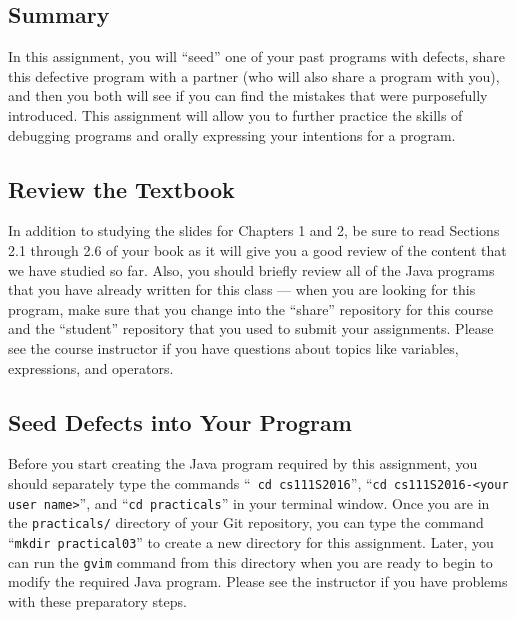


\vspace*{-.3in}
\subsection*{Summary}

In this assignment, you will ``seed'' one of your past programs with defects, share this defective program with a
partner (who will also share a program with you), and then you both will see if you can find the mistakes that were
purposefully introduced. This assignment will allow you to further practice the skills of debugging programs and orally
expressing your intentions for a program.

\vspace*{-.15in}
\subsection*{Review the Textbook}
\vspace*{-.075in}

In addition to studying the slides for Chapters 1 and 2, be sure to read Sections 2.1 through 2.6 of your book as it
will give you a good review of the content that we have studied so far. Also, you should briefly review all of the Java
programs that you have already written for this class --- when you are looking for this program, make sure that you
change into the ``share'' repository for this course and the ``student'' repository that you used to submit your
assignments. Please see the course instructor if you have questions about topics like variables, expressions, and
operators.

\vspace*{-.15in}
\subsection*{Seed Defects into Your Program}
\vspace*{-.075in}

Before you start creating the Java program required by this assignment, you should separately type the commands ``{\tt
cd cs111S2016}'', ``{\tt cd cs111S2016-<your user name>}'', and ``{\tt cd practicals}'' in your terminal window. Once
you are in the {\tt practicals/} directory of your Git repository, you can type the command ``{\tt mkdir practical03}''
to create a new directory for this assignment. Later, you can run the {\tt gvim} command from this directory when you
are ready to begin to modify the required Java program. Please see the instructor if you have problems with these
preparatory steps.

